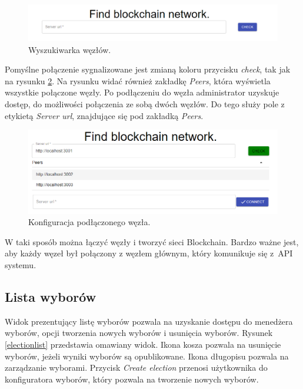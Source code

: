 \documentclass[a4paper,12pt]{book}
\begin{document}
\begin{figure}[h]
	\centering
	\includegraphics[width=\textwidth]{images/findnode.png}
	\caption{Wyszukiwarka węzłów.}\label{findnode}
\end {figure}

Pomyślne połączenie sygnalizowane jest zmianą koloru przycisku \textit{check}, tak jak na rysunku \ref{nodeconfig}. Na rysunku widać również zakładkę \textit{Peers}, która wyświetla wszystkie połączone węzły. Po podłączeniu do węzła administrator uzyskuje dostęp, do możliwości połączenia ze sobą dwóch węzłów. Do tego służy pole z etykietą \textit{Server url}, znajdujące się pod zakładką \textit{Peers}.

\begin{figure}[h]
	\centering
	\includegraphics[width=\textwidth]{images/ndoeconfig.png}
	\caption{Konfiguracja podłączonego węzła.}\label{nodeconfig}
\end {figure}

W taki sposób można łączyć węzły i tworzyć sieci Blockchain. Bardzo ważne jest, aby każdy węzeł był połączony z węzłem głównym, który komunikuje się z~API systemu.

\subsection{Lista wyborów}

Widok prezentujący listę wyborów pozwala na uzyskanie dostępu do menedżera wyborów, opcji tworzenia nowych wyborów i usunięcia wyborów. Rysunek \ref{electionlist} przedstawia omawiany widok. Ikona kosza pozwala na usunięcie wyborów, jeżeli wyniki wyborów są opublikowane. Ikona długopisu pozwala na zarządzanie wyborami. Przycisk \textit{Create election} przenosi użytkownika do konfiguratora wyborów, który pozwala na tworzenie nowych wyborów.
\end{document}
